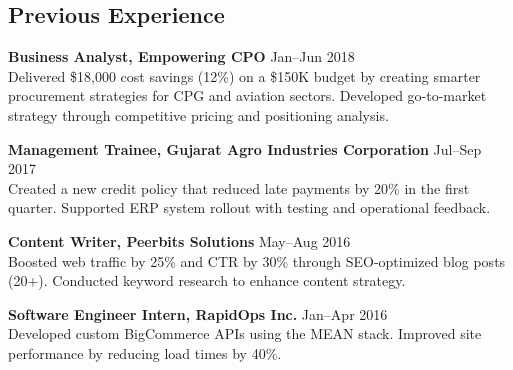\documentclass[]{deedy-resume-reversed}
\begin{document}
\begin{minipage}[t]{0.60\textwidth}

\subsection{Previous Experience}

\textbf{Business Analyst, Empowering CPO} \textbar{} Jan–Jun 2018\\
Delivered \$18,000 cost savings (12\%) on a \$150K budget by creating smarter procurement strategies for CPG and aviation sectors. Developed go-to-market strategy through competitive pricing and positioning analysis.

\textbf{Management Trainee, Gujarat Agro Industries Corporation} \textbar{} Jul–Sep 2017\\
Created a new credit policy that reduced late payments by 20\% in the first quarter. Supported ERP system rollout with testing and operational feedback.

\textbf{Content Writer, Peerbits Solutions} \textbar{} May–Aug 2016\\
Boosted web traffic by 25\% and CTR by 30\% through SEO-optimized blog posts (20+). Conducted keyword research to enhance content strategy.

\textbf{Software Engineer Intern, RapidOps Inc.} \textbar{} Jan–Apr 2016\\
Developed custom BigCommerce APIs using the MEAN stack. Improved site performance by reducing load times by 40\%.






\end{minipage}
\end{document}
